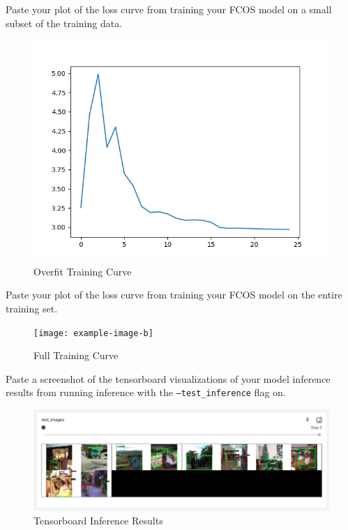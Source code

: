 \documentclass[11pt,addpoints,answers]{exam}
\numberwithin{equation}{section} %
\numberwithin{figure}{section} %
\numberwithin{table}{section} %
\begin{document}
\begin{questions}
\question Paste your plot of the loss curve from training your FCOS model on a small subset of the training data.

\begin{figure}[H]
    \centering
    \includegraphics{./results/q3/loss_overfit.png}
    \caption{Overfit Training Curve}
    \label{fig:overfit_plot}
\end{figure}
\question Paste your plot of the loss curve from training your FCOS model on the entire training set.

\begin{figure}[H]
    \centering
    \texttt{[image: example-image-b]}
    \caption{Full Training Curve}
    \label{fig:full_loss_plot}
\end{figure}

\question Paste a screenshot of the tensorboard visualizations of your model inference results from running inference with the \texttt{--test\_inference} flag on.

\begin{figure}[H]
    \centering
    \includegraphics[scale=0.55]{./results/q3/results.png}
    \caption{Tensorboard Inference Results}
    \label{fig:inference_results}
\end{figure}


\end{questions}
\end{document}
